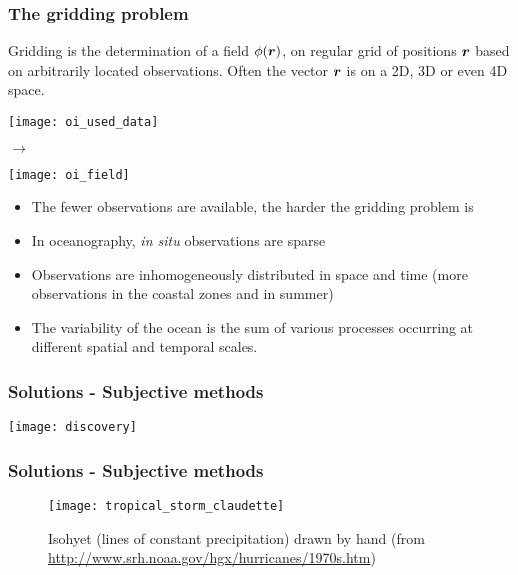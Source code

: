 
\begin{frame}
\frametitle{The gridding problem}

Gridding is the determination of a field $\phi(\mbox{\boldmath $ r $})$, on regular
grid of positions $\mbox{\boldmath $ r $}$ based on arbitrarily located
observations.  Often the vector $\mbox{\boldmath $ r $}$ is on a 2D, 3D or even 4D space.\\

\parbox[c]{.45\linewidth}{\texttt{[image: oi\_used\_data]}} $\rightarrow$
\parbox[c]{.45\linewidth}{\texttt{[image: oi\_field]}}

\begin{itemize} 
\item The fewer observations are available, the harder the gridding problem is
\item In oceanography, \textit{in situ} observations are sparse
\item Observations are inhomogeneously distributed in space and time (more observations in the coastal zones and in summer)
\item The variability of the ocean is the sum of various processes
occurring at different spatial and temporal scales. 
\end{itemize}

\end{frame}


\begin{frame}
\frametitle{Solutions - Subjective methods}

\centerline{
\texttt{[image: discovery]}
}
\end{frame}


\begin{frame}
\frametitle{Solutions - Subjective methods}

\begin{figure}[H]
\centerline{\texttt{[image: tropical\_storm\_claudette]}}
\caption{Isohyet (lines of constant precipitation) drawn by hand (from \url{http://www.srh.noaa.gov/hgx/hurricanes/1970s.htm})}
\label{fig:byhand}
\end{figure}

\end{frame}


